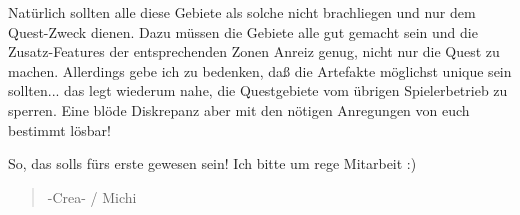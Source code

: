 \documentclass[10pt,a4paper,oneside,onecolumn]{article}
\begin{document}
Natürlich sollten alle diese Gebiete als solche nicht brachliegen
und nur dem Quest-Zweck dienen. Dazu müssen die Gebiete alle gut gemacht
sein und die Zusatz-Features der entsprechenden Zonen Anreiz genug,
nicht nur die Quest zu machen. Allerdings gebe ich zu bedenken, daß
die Artefakte möglichst unique sein sollten... das legt wiederum nahe,
die Questgebiete vom übrigen Spielerbetrieb zu sperren. Eine blöde
Diskrepanz aber mit den nötigen Anregungen von euch bestimmt lösbar!

So, das solls fürs erste gewesen sein! Ich bitte um rege Mitarbeit
:)

\begin{quotation}

-Crea- / Michi

\end{quotation}
\end{document}
